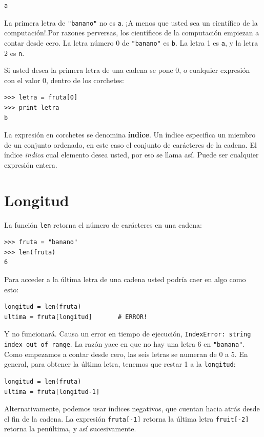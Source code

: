 \beforeverb
\begin{verbatim}
a
\end{verbatim}
\afterverb
%
La primera letra de \texttt{"banano"} no es \texttt{a}.  ¡A menos que usted
sea un científico de la computación!.Por  razones perversas, los 
científicos de la computación empiezan a contar desde cero. La letra número 
0 de \texttt{"banano"} es \texttt{b}.  La letra 1 es \texttt{a}, y la letra
 2 es \texttt{n}.

Si usted desea la primera letra de una cadena se pone 0, o cualquier
expresión con el valor 0, dentro de los corchetes:


\beforeverb
\begin{verbatim}
>>> letra = fruta[0]
>>> print letra
b
\end{verbatim}
\afterverb
%
La expresión en corchetes se denomina {\bf índice}.  Un índice
especifica un miembro de un conjunto ordenado, en este caso el 
conjunto de carácteres de la cadena. El índice  {\em indica} cual
elemento desea usted, por eso se llama así. Puede ser cualquier expresión
entera.



\section{Longitud}

La función  \texttt{len} retorna el número de carácteres en una cadena:

\beforeverb
\begin{verbatim}
>>> fruta = "banano"
>>> len(fruta)
6
\end{verbatim}
\afterverb
%
Para acceder a la última letra de una cadena usted podría caer en algo
como esto:

\beforeverb
\begin{verbatim}
longitud = len(fruta)
ultima = fruta[longitud]       # ERROR!
\end{verbatim}
\afterverb
%
Y no funcionará. Causa un error en tiempo de ejecución, \texttt{IndexError: string
index out of range}.  La razón yace en que no hay una letra 6 en 
\texttt{"banana"}.  Como empezamos a contar desde cero, las seis letras
se numeran de 0 a 5. En general, para obtener la última letra, tenemos que restar 1 a  la \texttt{longitud}:


\beforeverb
\begin{verbatim}
longitud = len(fruta)
ultima = fruta[longitud-1]
\end{verbatim}
\afterverb
%
Alternativamente, podemos usar índices negativos, que cuentan hacia atrás 
desde el fin de la cadena. La expresión \texttt{fruta[-1]} retorna la última letra
\texttt{fruit[-2]} retorna la penúltima, y así sucesivamente.

